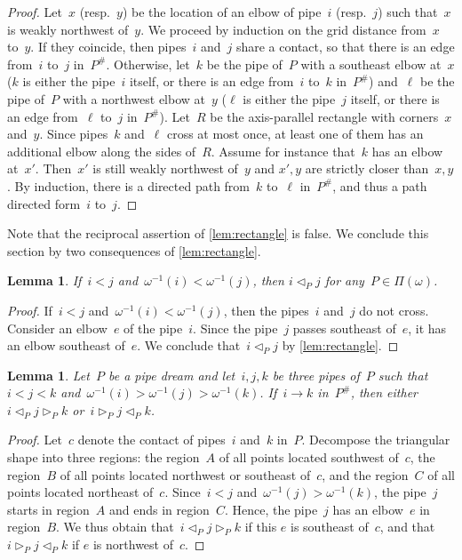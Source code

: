 \documentclass[reqno]{amsart}
\newtheorem{lemma}[theorem]{Lemma}
\theoremstyle{definition}
\newcommand{\pipeDreams}{\Pi} %
\newcommand{\contact}{^\#} %
\newcommand{\less}{\vartriangleleft} %
\newcommand{\more}{\vartriangleright} %
\newcommand{\contactLess}[1]{\less_{#1}} %
\newcommand{\contactMore}[1]{\more_{#1}} %
\begin{document}
\begin{proof}
Let~$x$ (resp.~$y$) be the location of an elbow of pipe~$i$ (resp.~$j$) such that~$x$ is weakly northwest of~$y$.
We proceed by induction on the grid distance from~$x$ to~$y$.
If they coincide, then pipes~$i$ and~$j$ share a contact, so that there is an edge from~$i$ to~$j$ in~$P\contact$.
Otherwise, let~$k$ be the pipe of~$P$ with a southeast elbow at~$x$ ($k$ is either the pipe~$i$ itself, or there is an edge from~$i$ to~$k$ in~$P\contact$) and~$\ell$ be the pipe of~$P$ with a northwest elbow at~$y$ ($\ell$ is either the pipe~$j$ itself, or there is an edge from~$\ell$ to~$j$ in~$P\contact$).
Let~$R$ be the axis-parallel rectangle with corners~$x$ and~$y$.
Since pipes~$k$ and~$\ell$ cross at most once, at least one of them has an additional elbow along the sides of~$R$.
Assume for instance that~$k$ has an elbow at~$x'$.
Then~$x'$ is still weakly northwest of~$y$ and $x',y$ are strictly closer than~$x,y$.
By induction, there is a directed path from~$k$ to~$\ell$ in~$P\contact$, and thus a path directed form~$i$ to~$j$.
\end{proof}

Note that the reciprocal assertion of \cref{lem:rectangle} is false.
We conclude this section by two consequences of \cref{lem:rectangle}.

\begin{lemma}
\label{lem:consequenceRectangle1}
If~$i < j$ and~$\omega^{-1}(i) < \omega^{-1}(j)$, then $i \contactLess{P} j$ for any~$P \in \pipeDreams(\omega)$.
\end{lemma}

\begin{proof}
If~$i < j$ and~$\omega^{-1}(i) < \omega^{-1}(j)$, then the pipes~$i$ and~$j$ do not cross.
Consider an elbow~$e$ of the pipe~$i$.
Since the pipe~$j$ passes southeast of~$e$, it has an elbow southeast of~$e$.
We conclude that~$i \contactLess{P} j$ by \cref{lem:rectangle}.
\end{proof}

\begin{lemma}
\label{lem:consequenceRectangle2}
Let~$P$ be a pipe dream and let~$i,j,k$ be three pipes of~$P$ such that~$i < j < k$ and~$\omega^{-1}(i) > \omega^{-1}(j) > \omega^{-1}(k)$.
If~$i \to k$ in~$P\contact$, then either~$i \contactLess{P} j \contactMore{P} k$ or~$i \contactMore{P} j \contactLess{P} k$.
\end{lemma}

\begin{proof}
Let~$c$ denote the contact of pipes~$i$ and~$k$ in~$P$.
Decompose the triangular shape into three regions: the region~$A$ of all points located southwest of~$c$, the region~$B$ of all points located northwest or southeast of~$c$, and the region~$C$ of all points located northeast of~$c$.
Since~$i < j$ and~$\omega^{-1}(j) > \omega^{-1}(k)$, the pipe~$j$ starts in region~$A$ and ends in region~$C$.
Hence, the pipe~$j$ has an elbow~$e$ in region~$B$.
We thus obtain that~$i \contactLess{P} j \contactMore{P} k$ if this $e$ is southeast of~$c$, and that~$i \contactMore{P} j \contactLess{P} k$ if $e$ is northwest of~$c$.
\end{proof}
\end{document}

